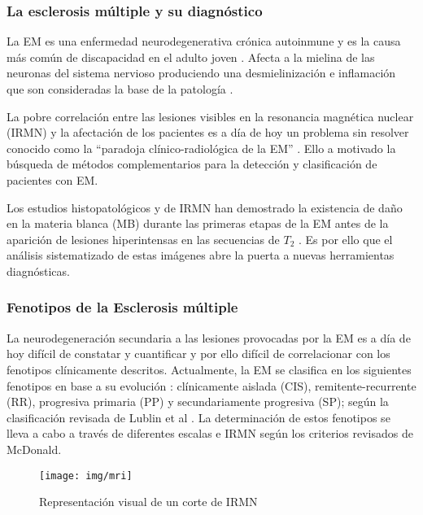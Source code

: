 \documentclass[fleqn,12pt]{UICArticle} %
\begin{document}

\subsubsection{La esclerosis múltiple y su diagnóstico}

La EM es una enfermedad neurodegenerativa crónica autoinmune y es la causa más común de discapacidad en el adulto joven \cite{Polman2011}. Afecta a la mielina de las neuronas del sistema nervioso produciendo una desmielinización e inflamación que son consideradas la base de la patología \cite{Br2005}.

La pobre correlación entre las lesiones visibles en la resonancia magnética nuclear (IRMN) y la afectación de los pacientes es a día de hoy un problema sin resolver conocido como la “paradoja clínico-radiológica de la EM” \cite{Barkhof2002}. Ello a motivado la búsqueda de métodos complementarios para la detección y clasificación de pacientes con EM.

Los estudios histopatológicos y de IRMN han demostrado la existencia de daño en la materia blanca (MB) durante las primeras etapas de la EM antes de la aparición de lesiones hiperintensas en las secuencias de $T_2$ \cite{Beer2016, Moll2011, Miller2003}. Es por ello que el análisis sistematizado de estas imágenes abre la puerta a nuevas herramientas diagnósticas.

\subsubsection{Fenotipos de la Esclerosis múltiple}

La neurodegeneración secundaria a las lesiones provocadas por la EM es a día de hoy difícil de constatar y cuantificar y por ello difícil de correlacionar con los fenotipos clínicamente descritos. Actualmente, la EM se clasifica en los siguientes fenotipos en base a su evolución : clínicamente aislada (CIS), remitente-recurrente (RR), progresiva primaria (PP) y secundariamente progresiva (SP); según la clasificación revisada de Lublin et al \cite{Lublin2014}. La determinación de estos fenotipos se lleva a cabo a través de diferentes escalas e IRMN según los criterios revisados de McDonald\cite{Polman20112}.

\begin{figure}[h]
	\centering
	\texttt{[image: img/mri]}
	\caption{Representación visual de un corte de IRMN}
	\label{fig:voxeles}
\end{figure}
\end{document}
